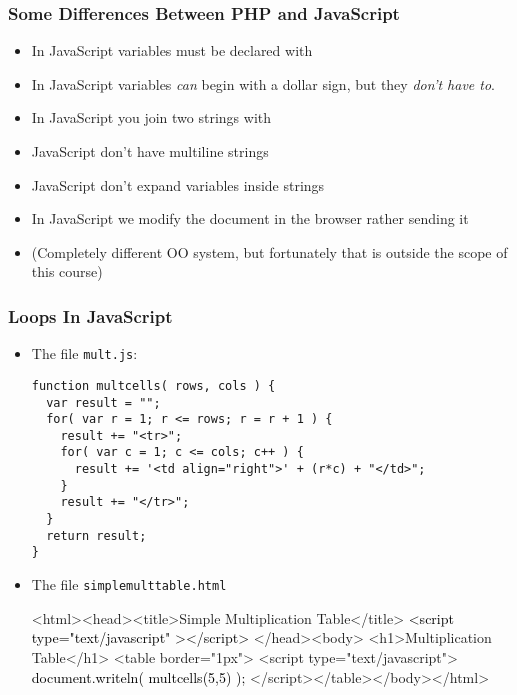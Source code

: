 \documentclass[dvipsnames]{beamer}
\begin{document}
\begin{frame} 
\frametitle{Some Differences Between PHP and JavaScript}

\begin{itemize}
\item In JavaScript variables must be declared with
\item In JavaScript variables \emph{can} begin with a dollar sign, but
  they \emph{don't have to}.
\item In JavaScript you join two strings with \intro{\texttt{+}}
\item JavaScript don't have multiline strings
\item JavaScript don't expand variables inside strings
\item In JavaScript we modify the document in the browser rather
  sending it
\item (Completely different OO system, but fortunately that is outside
  the scope of this course)
\end{itemize}  
\end{frame}



\begin{frame}[fragile] 
\frametitle{Loops In JavaScript}
  
\begin{itemize}[<+->]

\item The file \texttt{mult.js}:
  \begin{footnotesize}
\begin{verbatim}
function multcells( rows, cols ) {
  var result = "";
  for( var r = 1; r <= rows; r = r + 1 ) {
    result += "<tr>";
    for( var c = 1; c <= cols; c++ ) {
      result += '<td align="right">' + (r*c) + "</td>";
    }
    result += "</tr>";
  }
  return result; 
}      
\end{verbatim}
  \end{footnotesize}

\item The file \texttt{simplemulttable.html}%
\begin{footnotesize}%
\begin{semiverbatim}
\color{gray}<html><head><title>Simple Multiplication Table</title>
\textcolor{black}{<script type="text/javascript"  ></script>}
</head><body>
  <h1>Multiplication Table</h1>
  <table border="1px">
  <script type="text/javascript">
    \textcolor{black}{document.writeln( multcells(5,5) );}
  </script></table></body></html>
\end{semiverbatim}
\end{footnotesize}
\end{itemize}
\end{frame}
\end{document}
